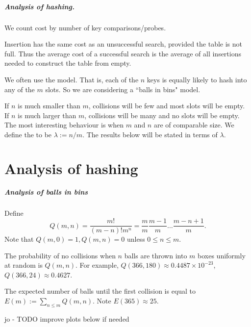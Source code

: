 \paragraph{Analysis of hashing.}

We count cost by number of key comparisons/probes.

Insertion has the same cost as an unsuccessful search, provided the table 
is not full. Thus the average cost of a successful search is the average of all insertions
 needed to construct the table from empty.

We often use the  model. That is, each of 
the $n$ keys is equally likely to hash into any of the $m$ slots. So we are 
considering a ``balls in bins" model.

If $n$ is much smaller than $m$, collisions will be few and most slots 
will be empty. If $n$ is much larger than $m$, collisions will be many and no 
slots will be empty. The most interesting behaviour is when $m$ and $n$ are 
of comparable size. We define the  to be $\lambda := n/m$. The results below 
will be stated in terms of $\lambda$.


\chapter{Analysis of hashing} %

\paragraph{Analysis of balls in bins}
Define 
$$Q(m, n) = \frac{m!}{(m-n)! m^n} = \frac{m}{m} \frac{m-1}{m} \dots 
\frac{m - n + 1}{m}.$$
Note that $Q(m,0) = 1, Q(m, n) = 0$ unless $0 \leq n \leq m$.

The probability of no collisions when $n$ balls are thrown into $m$ boxes 
uniformly at random is $Q(m, n)$. For example, $Q(366, 180) \approx 0.4487
 \times 10^{-23}$, $Q(366, 24) \approx  0.4627$. 

The expected number of balls until the first collision is equal to 
$E(m):=\sum_{n \leq m} Q(m, n)$. Note $E(365) \approx 25$.

jo - TODO improve plots below if needed


